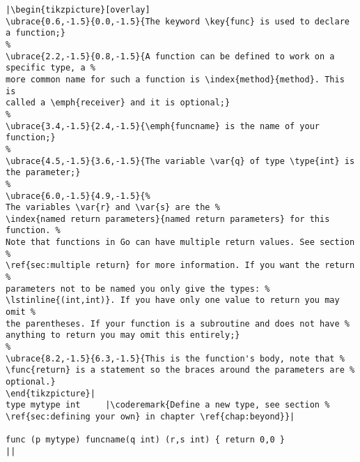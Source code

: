 \begin{lstlisting}[caption=A function declaration,label=src:function definition]
|\begin{tikzpicture}[overlay]
\ubrace{0.6,-1.5}{0.0,-1.5}{The keyword \key{func} is used to declare a function;}
%
\ubrace{2.2,-1.5}{0.8,-1.5}{A function can be defined to work on a specific type, a %
more common name for such a function is \index{method}{method}. This is
called a \emph{receiver} and it is optional;}
%
\ubrace{3.4,-1.5}{2.4,-1.5}{\emph{funcname} is the name of your function;}
%
\ubrace{4.5,-1.5}{3.6,-1.5}{The variable \var{q} of type \type{int} is the parameter;}
%
\ubrace{6.0,-1.5}{4.9,-1.5}{%
The variables \var{r} and \var{s} are the %
\index{named return parameters}{named return parameters} for this function. %
Note that functions in Go can have multiple return values. See section %
\ref{sec:multiple return} for more information. If you want the return %
parameters not to be named you only give the types: %
\lstinline{(int,int)}. If you have only one value to return you may omit %
the parentheses. If your function is a subroutine and does not have %
anything to return you may omit this entirely;}
%
\ubrace{8.2,-1.5}{6.3,-1.5}{This is the function's body, note that %
\func{return} is a statement so the braces around the parameters are %
optional.}
\end{tikzpicture}|
type mytype int	    |\coderemark{Define a new type, see section %
\ref{sec:defining your own} in chapter \ref{chap:beyond}}|

func (p mytype) funcname(q int) (r,s int) { return 0,0 }
||
\end{lstlisting}
